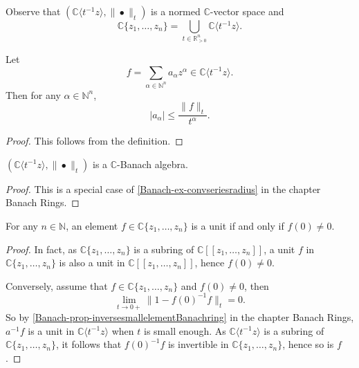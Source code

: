 Observe that $(\mathbb{C}\langle t^{-1}z\rangle ,\|\bullet\|_t)$ is a normed $\mathbb{C}$-vector space and
\begin{equation}\label{eq-convpowerseriesasunion}
    \mathbb{C}\{ z_1,\ldots,z_n\}=\bigcup_{t\in \mathbb{R}_{>0}^n}\mathbb{C}\langle t^{-1}z\rangle .
\end{equation}

\begin{proposition}
    Let 
    \[
        f=\sum_{\alpha\in \mathbb{N}^n} a_{\alpha}z^{\alpha}\in  \mathbb{C}\langle t^{-1}z\rangle. 
    \]
    Then for any $\alpha \in \mathbb{N}^n$,
    \[
      |a_{\alpha}|\leq  \frac{\|f\|_t}{t^{\alpha}}.
    \]
\end{proposition}
\begin{proof}
    This follows from the definition.
\end{proof}

\begin{proposition}\label{prop-CzztBanachalg}
    $(\mathbb{C}\langle t^{-1}z\rangle ,\|\bullet\|_t)$ is a $\mathbb{C}$-Banach algebra.
\end{proposition}
\begin{proof}
    This is a special case of \cref{Banach-ex-convseriesradius} in the chapter Banach Rings.
\end{proof}


\begin{lemma}\label{lma-unitsinconvpowerseries}
    For any $n\in \mathbb{N}$, an element $f\in \mathbb{C}\{ z_1,\ldots,z_n \}$ is a unit if and only if $f(0)\neq 0$.
\end{lemma}
\begin{proof}
    In fact, as $\mathbb{C}\{ z_1,\ldots,z_n \}$ is a subring of $\mathbb{C}[[z_1,\ldots,z_n]]$, a unit $f$ in $\mathbb{C}\{ z_1,\ldots,z_n \}$ is also a unit in $\mathbb{C}[[z_1,\ldots,z_n]]$, hence $f(0)\neq 0$.

    Conversely, assume that $f\in \mathbb{C}\{ z_1,\ldots,z_n \}$ and $f(0)\neq 0$, then
    \[
        \lim_{t\to 0+}\|1-f(0)^{-1}f\|_t=0.
    \]
    So by \cref{Banach-prop-inversesmallelementBanachring} in the chapter Banach Rings, $a^{-1}f$ is a unit in $\mathbb{C}\langle t^{-1}z\rangle$ when $t$ is small enough. As $\mathbb{C}\langle t^{-1}z\rangle$ is a subring of $\mathbb{C}\{ z_1,\ldots,z_n \}$, it follows that $f(0)^{-1}f$ is invertible in $\mathbb{C}\{ z_1,\ldots,z_n \}$, hence so is $f$.
\end{proof}



